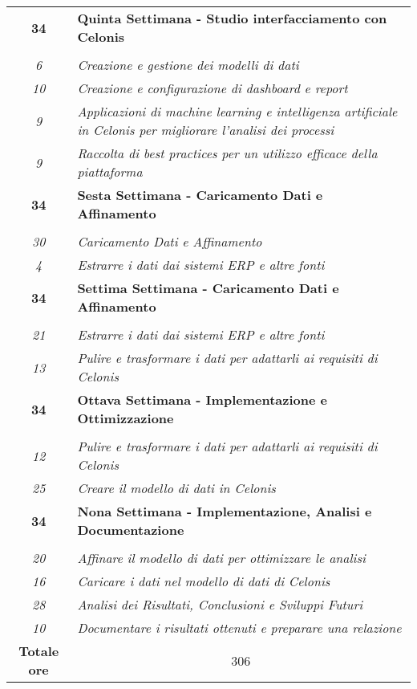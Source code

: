\begin{tabularx}{\textwidth}{|c|X|}
\textbf{34} & \textbf{Quinta Settimana - Studio interfacciamento con Celonis} \\
\hdashline
\multirow{4}{0cm}\\
\textit{6} &
\textit{Creazione e gestione dei modelli di dati} \\
\textit{10} &
\textit{Creazione e configurazione di dashboard e report} \\
\textit{9} &
\textit{Applicazioni di machine learning e intelligenza artificiale in Celonis per migliorare l'analisi dei processi} \\
\textit{9} &
\textit{Raccolta di best practices per un utilizzo efficace della piattaforma} \\
\hline

\textbf{34} & \textbf{Sesta Settimana - Caricamento Dati e Affinamento} \\
\hdashline
\multirow{5}{0cm}\\
\textit{30} &
\textit{Caricamento Dati e Affinamento} \\
\textit{4} &
\textit{Estrarre i dati dai sistemi ERP e altre fonti} \\
\hline

\textbf{34} & \textbf{Settima Settimana - Caricamento Dati e Affinamento} \\
\hdashline
\multirow{3}{0cm}\\
\textit{21} &
\textit{Estrarre i dati dai sistemi ERP e altre fonti} \\
\textit{13} &
\textit{Pulire e trasformare i dati per adattarli ai requisiti di Celonis} \\
\hline

\textbf{34} & \textbf{Ottava Settimana - Implementazione e Ottimizzazione} \\
\hdashline
\multirow{4}{0cm}\\
\textit{12} &
\textit{Pulire e trasformare i dati per adattarli ai requisiti di Celonis} \\
\textit{25} &
\textit{Creare il modello di dati in Celonis} \\
\hline

\textbf{34} & \textbf{Nona Settimana - Implementazione, Analisi e Documentazione} \\
\hdashline
\multirow{6}{0cm}\\
\textit{20} &
\textit{Affinare il modello di dati per ottimizzare le analisi} \\
\textit{16} &
\textit{Caricare i dati nel modello di dati di Celonis} \\
\textit{28} &
\textit{Analisi dei Risultati, Conclusioni e Sviluppi Futuri} \\
\textit{10} &
\textit{Documentare i risultati ottenuti e preparare una relazione} \\
\hline

\textbf{Totale ore} & \multicolumn{1}{|c|}{306} \\\hline

\end{tabularx}
